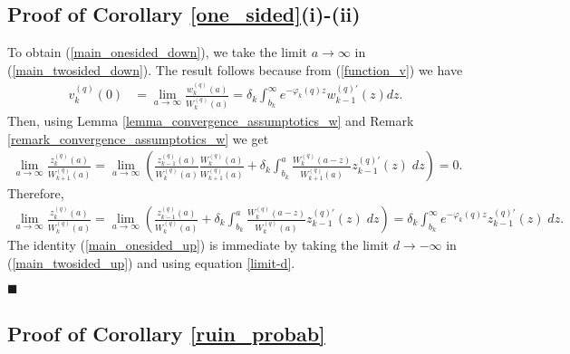 \documentclass[12pt,reqno]{amsart}
\newcommand{\red}{\textcolor[rgb]{1.00,0.00,0.00}}
\newcommand{\blue}{\textcolor[rgb]{0.00,0.00,1.00}}
\theoremstyle{definition}
\theoremstyle{remark}
\begin{document}
\subsection{Proof of  Corollary \ref{one_sided}(i)-(ii)}
	To obtain (\ref{main_onesided_down}), we take the limit $a\rightarrow \infty$ in (\ref{main_twosided_down}). The result follows because from (\ref{function_v}) we have
	\begin{align*}
v_k^{(q)}(0)&=\lim_{a\to\infty}\frac{w_k^{(q)}(a)}{W_{k}^{(q)}(a)}=\delta_k\int_{b_k}^{\infty} e^{-\varphi_k(q)z}w_{k-1}^{(q)\prime}(z)dz.
\end{align*}
Then, using Lemma \ref{lemma_convergence_assumptotics_w} and Remark \ref{remark_convergence_assumptotics_w} we get 
\begin{align*}
\lim_{a\to\infty}\frac{z_k^{(q)}(a)}{W_{k+1}^{(q)}(a)}=\lim_{a\to\infty}\left(\frac{z_{k-1}^{(q)}(a)}{W_k^{(q)}(a)}\frac{W_k^{(q)}(a)}{W_{k+1}^{(q)}(a)}
+\delta_k\int_{b_k}^a\frac{W_k^{(q)}(a-z)}{W_{k+1}^{(q)}(a)}z_{k-1}^{(q)\prime}(z)\;dz\right)=0.
\end{align*}
Therefore,
\begin{align}\nonumber
\lim_{a\to\infty}\frac{z_k^{(q)}(a)}{W_{k}^{(q)}(a)}=\lim_{a\to\infty}\left(\frac{z_{k-1}^{(q)}(a)}{W_k^{(q)}(a)}+
\delta_k\int_{b_k}^a\frac{W_k^{(q)}(a-z)}{W_{k}^{(q)}(a)}z_{k-1}^{(q)\prime}(z)\;dz\right)=
\delta_k\int_{b_k}^{\infty} e^{-\varphi_k(q)z}z_{k-1}^{(q)\prime}(z)\;dz.
\end{align}
The identity (\ref{main_onesided_up}) is immediate by taking the limit $d\rightarrow -\infty$ in (\ref{main_twosided_up}) and using
equation \eqref{limit-d}.
\begin{flushright}$\blacksquare$\end{flushright}
\subsection{Proof of  Corollary \ref{ruin_probab}}
\end{document}
